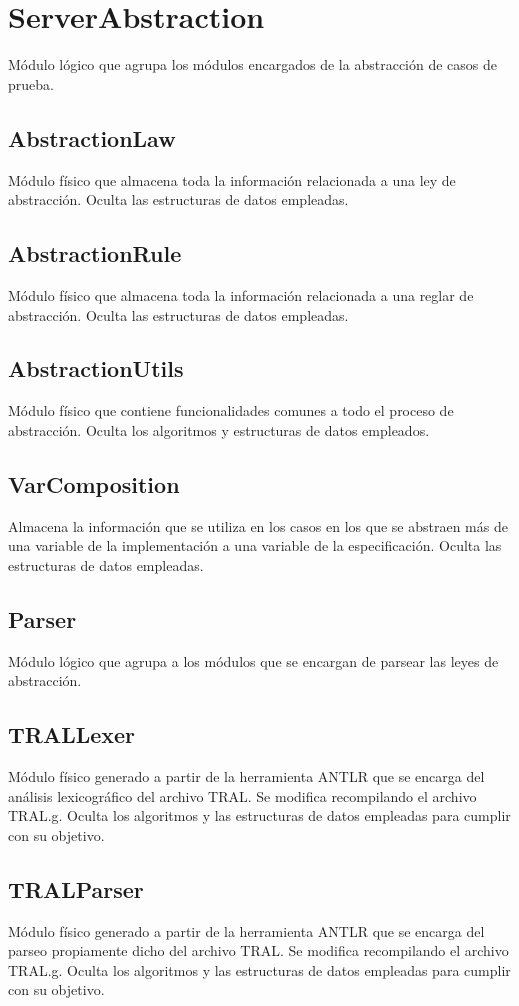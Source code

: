\documentclass[a4paper,10pt]{report}
\begin{document}
	\section{ServerAbstraction}
		Módulo lógico que agrupa los módulos encargados de la abstracción de casos de prueba.
		\subsection{AbstractionLaw}
		Módulo físico que almacena toda la información relacionada a una ley de abstracción. Oculta las estructuras de datos empleadas.
		\subsection{AbstractionRule}
		Módulo físico que almacena toda la información relacionada a una reglar de abstracción. Oculta las estructuras de datos empleadas.
		\subsection{AbstractionUtils}
		Módulo físico que contiene funcionalidades comunes a todo el proceso de abstracción. Oculta los algoritmos y estructuras de datos empleados.
		\subsection{VarComposition}
		Almacena la información que se utiliza en los casos en los que se abstraen más de una variable de la implementación a una variable de la especificación. Oculta las estructuras de datos empleadas.
		\subsection{Parser}
		Módulo lógico que agrupa a los módulos que se encargan de parsear las leyes de abstracción.
			\subsection{TRALLexer}
			Módulo físico generado a partir de la herramienta ANTLR que se encarga del análisis lexicográfico del archivo TRAL. Se modifica recompilando el archivo TRAL.g. Oculta los algoritmos y las estructuras de datos empleadas para cumplir con su objetivo.
			\subsection{TRALParser}
			Módulo físico generado a partir de la herramienta ANTLR que se encarga del parseo propiamente dicho del archivo TRAL. Se modifica recompilando el archivo TRAL.g. Oculta los algoritmos y las estructuras de datos empleadas para cumplir con su objetivo.
\end{document}
